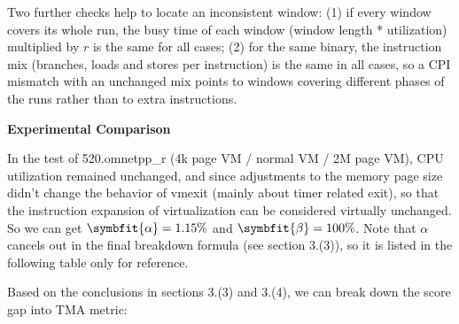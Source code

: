 \documentclass[12pt]{article}
\newcommand\tablefont{\normalfont}}}}
\newcommand{\npar}[1]{#1\par}
\newcommand{\emptypar}{\mbox{}\par}
\newcommand{\numpara}[4]{{\hangindent=#1\relax\hangafter=1\relax
  \noindent\hspace*{\dimexpr#1-#2\relax}\makebox[#2][l]{#3}#4\par}}
\begin{document}
\npar{\hspace*{4\fontdimen2\font}Two further checks help to locate an inconsistent window: (1) if every window covers its whole run, the busy time of each window (window length * utilization) multiplied by $\mathit{r}$ is the same for all cases; (2) for the same binary, the instruction mix (branches, loads and stores per instruction) is the same in all cases, so a CPI mismatch with an unchanged mix points to windows covering different phases of the runs rather than to extra instructions.}
\emptypar
\numpara{18.00pt}{18.00pt}{\textbf{4.}}{\textbf{Experimental Comparison}}
\npar{\hspace*{9.75pt}In the test of 520.omnetpp\_r ({\fontsize{11pt}{15.54pt}\selectfont 4k page }{\fontsize{11pt}{15.54pt}\selectfont VM / normal VM / 2M page VM}), CPU utilization remained unchanged, and since adjustments to the memory page size didn’t change the behavior of vmexit (mainly about timer related exit), so that the instruction expansion of virtualization can be considered virtually unchanged. So we can get\textit{\textbf{ }}$\symbfit{\alpha}=1.15\%$ and $\symbfit{\beta}=100\%$. Note that $\alpha $ cancels out in the final breakdown formula (see section 3.(3)), so it is listed in the following table only for reference.}
\npar{\hspace*{9.75pt}Based on the conclusions in sections 3.(3) and 3.(4), we can break down the score gap into TMA metric:}
\emptypar
\par\begingroup\tablefont\fontsize{11pt}{13.42pt}\selectfont\setlength{\tabcolsep}{5.40pt}
\end{document}
